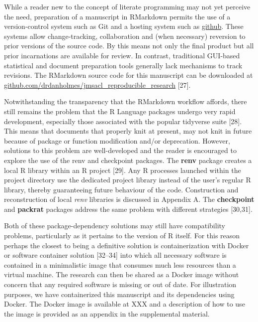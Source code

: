 \documentclass[]{elsarticle} %
\begin{document}
While a reader new to the concept of literate programming may not yet
perceive the need, preparation of a manuscript in RMarkdown permits the
use of a version-control system such as Git and a hosting system such as
\href{https://github.com/}{github}. These systems allow change-tracking,
collaboration and (when necessary) reversion to prior versions of the
source code. By this means not only the final product but all prior
incarnations are available for review. In contrast, traditional
GUI-based statistical and document preparation tools generally lack
mechanisms to track revisions. The RMarkdown source code for this
manuscript can be downloaded at
\href{https://github.com/drdanholmes/jmsacl_reproducible_research}{github.com/drdanholmes/jmsacl\_reproducible\_research}
{[}27{]}.

Notwithstanding the transparency that the RMarkdown workflow affords,
there still remains the problem that the R Language packages undergo
very rapid development, especially those associated with the popular
tidyverse suite {[}28{]}. This means that documents that properly knit
at present, may not knit in future because of package or function
modification and/or deprecation. However, solutions to this problem are
well-developed and the reader is encouraged to explore the use of the
renv and checkpoint packages. The \textbf{renv} package creates a local
R library within an R project {[}29{]}. Any R processes launched within
the project directory use the dedicated project library instead of the
user's regular R library, thereby guaranteeing future behaviour of the
code. Construction and reconstruction of local \emph{renv} libraries is
discussed in Appendix A. The \textbf{checkpoint} and \textbf{packrat}
packages address the same problem with different strategies {[}30,31{]}.

Both of these package-dependency solutions may still have compatibility
problems, particularly as it pertains to the version of R itself. For
this reason perhaps the closest to being a definitive solution is
containerization with Docker or software container solution {[}32--34{]}
into which all necessary software is contained in a minimalistic image
that consumes much less resources than a virtual machine. The research
can then be shared as a Docker image without concern that any required
software is missing or out of date. For illustration purposes, we have
containerized this manuscript and its dependencies using Docker. The
Docker image is available at XXX and a description of how to use the
image is provided as an appendix in the supplemental material.
\end{document}
